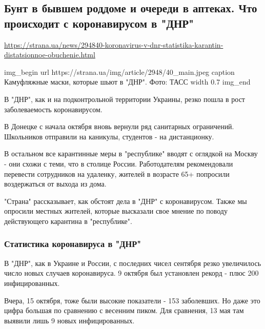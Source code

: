 


\subsection{Бунт в бывшем роддоме и очереди в аптеках. Что происходит с коронавирусом в "ДНР"}
\label{sec:16_10_2020.news.ua.bbc.strana.2.dnr_covid_roddom}


\url{https://strana.ua/news/294840-koronavirus-v-dnr-statistika-karantin-distatsionnoe-obuchenie.html}

\ifcmt
img_begin 
	url https://strana.ua/img/article/2948/40_main.jpeg
	caption Камуфляжные маски, которые шьют в "ДНР". Фото: ТАСС 
	width 0.7
img_end
\fi

В "ДНР", как и на подконтрольной территории Украины, резко пошла в рост
заболеваемость коронавирусом.

В Донецке с начала октября вновь вернули ряд санитарных ограничений. Школьников
отправили на каникулы, студентов - на дистанционку. 

В остальном все карантинные меры в "республике" вводят с оглядкой на Москву -
они схожи с теми, что в столице России. Работодателям рекомендовали перевести
сотрудников на удаленку, жителей в возрасте 65+ попросили воздержаться от
выхода из дома. 

"Страна" рассказывает, как обстоят дела в "ДНР" с коронавирусом. Также мы
опросили местных жителей, которые высказали свое мнение по поводу действующего
карантина в "республике". 

\subsubsection{Статистика коронавируса в "ДНР"}

В "ДНР", как в Украине и России, с последних чисел сентября резко увеличилось
число новых случаев коронавируса. 9 октября был установлен рекорд - плюс 200
инфицированных.

Вчера, 15 октября, тоже были высокие показатели - 153 заболевших. Но даже это
цифра большая по сравнению с весенним пиком. Для сравнения, 13 мая там выявили
лишь 9 новых инфицированных. 

